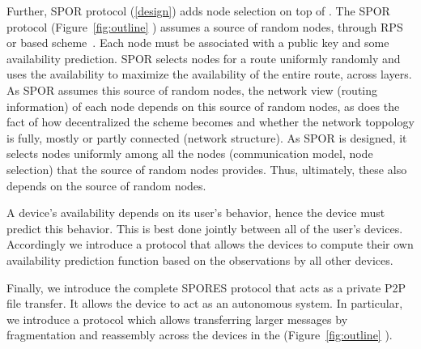 Further, \ac{SPOR} protocol (\cref{design}) adds node selection on top of \Sphinxes.
The \ac{SPOR} protocol (Figure~\ref{fig:outline} )  assumes a source of random nodes, \eg through 
\ac{RPS}~\cite[\eg][]{BrahmsRPS} or  based 
scheme~\cite[\eg][]{Octopus}.
Each node must be associated with a public key and some availability 
prediction.
\Ac{SPOR} selects nodes for a route uniformly randomly and uses the 
availability to maximize the availability of the entire route, \ie across 
layers.
As \ac{SPOR} assumes this source of random nodes, the network view (routing 
information) of each node depends on this source of random nodes, as does the 
fact of how decentralized the scheme becomes and whether the network toppology 
is fully, mostly or partly connected (network structure).
As \ac{SPOR} is designed, it selects nodes uniformly among all the nodes 
(communication model, node selection) that the source of random nodes provides.
Thus, ultimately, these also depends on the source of random nodes.

A device's availability depends on its user's behavior, hence the device must 
predict this behavior. This is best done jointly between all of the user's devices.
Accordingly we introduce a protocol that allows the devices to 
compute their own availability prediction function based on the observations by 
all other devices.

Finally, we introduce the complete \ac{SPORES} protocol that acts as a private P2P file transfer. It 
allows the device \squad to act as an autonomous system.
In particular, we introduce a protocol which allows transferring larger 
messages by fragmentation and reassembly across the devices in the \squad  (Figure~\ref{fig:outline} ).